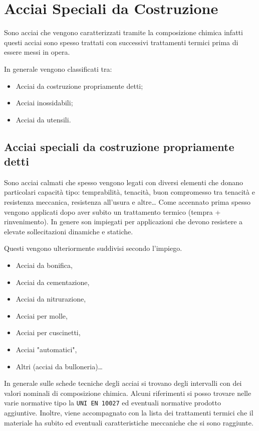 \chapter{Acciai Speciali da Costruzione}\label{chp:SpecCostruzione}
Sono acciai che vengono caratterizzati tramite la composizione chimica
infatti questi acciai sono spesso trattati con successivi
trattamenti termici prima di essere messi in opera.

In generale vengono classificati tra:
\begin{itemize}
\item Acciai da costruzione propriamente detti;
\item Acciai inossidabili;
\item Acciai da utensili.
\end{itemize}

\section{Acciai speciali da costruzione propriamente detti}
Sono acciai calmati che spesso vengono legati con diversi elementi che donano
particolari capacità tipo: temprabilità, tenacità, buon compromesso tra
tenacità e resistenza meccanica, resistenza all'usura e altre\dots
Come accennato prima spesso vengono applicati dopo aver subito un trattamento 
termico (tempra + rinvenimento).
In genere son impiegati per applicazioni che devono resistere a elevate 
sollecitazioni dinamiche e statiche.

Questi vengono ulteriormente suddivisi secondo l'impiego.
\begin{itemize}
\item Acciai da bonifica,
\item Acciai da cementazione,
\item Acciai da nitrurazione,
\item Acciai per molle,
\item Acciai per cuscinetti,
\item Acciai "automatici",
\item Altri (acciai da bulloneria)\dots
\end{itemize}

In generale sulle schede tecniche degli acciai si trovano degli intervalli 
con dei valori nominali di composizione chimica. Alcuni riferimenti si posso 
trovare nelle varie normative tipo la \texttt{UNI EN 10027} ed eventuali 
normative prodotto aggiuntive.
Inoltre, viene accompagnato con la lista dei trattamenti termici che il 
materiale ha subito ed eventuali caratteristiche meccaniche che si sono 
raggiunte.

